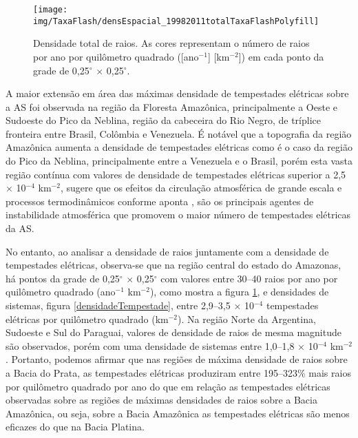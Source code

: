 \begin{figure}[!ht]
 \centering
  {\texttt{[image: img/TaxaFlash/densEspacial\_19982011totalTaxaFlashPolyfill]}}
  \caption{Densidade total de raios. As cores representam o número de raios por ano por quilômetro quadrado ([ano$^{-1}$] [km$^{-2}$]) em cada ponto da grade de 0,25$^{\circ}$ $\times$ 0,25$^{\circ}$. }
  \label{densidadeRaios}
\end{figure}


A maior extensão em área das máximas densidade de tempestades elétricas sobre a AS foi observada na região da Floresta Amazônica, principalmente a Oeste e Sudoeste do Pico da Neblina, região da cabeceira do Rio Negro, de tríplice fronteira entre Brasil, Colômbia e Venezuela. É notável que a topografia da região Amazônica aumenta a densidade de tempestades elétricas como é o caso da região do Pico da Neblina, principalmente entre a Venezuela e o Brasil, porém esta vasta região contínua com valores de densidade de tempestades elétricas superior a  2,5 $\times$ 10$^{-4}$ km$^{-2}$, sugere que os efeitos da circulação atmosférica de grande escala e processos termodinâmicos conforme aponta , são os principais agentes de instabilidade atmosférica que promovem o maior número de tempestades elétricas da AS. 

No entanto, ao analisar a densidade de raios juntamente com a densidade de tempestades elétricas, observa-se que na região central do estado do Amazonas, há pontos da grade de 0,25$^{\circ}$ $\times$ 0,25$^{\circ}$ com valores entre 30--40 raios por ano por quilômetro quadrado (ano$^{-1}$ km$^{-2}$), como mostra a figura \ref{densidadeRaios},  e densidades de sistemas, figura \ref{densidadeTempestade}, entre 2,9--3,5 $\times$ 10$^{-4}$ tempestades elétricas por quilômetro quadrado (km$^{-2}$). Na região Norte da Argentina, Sudoeste e Sul do Paraguai, valores de densidade de raios de mesma magnitude são observados, porém com uma densidade de sistemas entre 1,0--1,8 $\times$ 10$^{-4}$ km$^{-2}$. Portanto, podemos afirmar que nas regiões de máxima densidade de raios sobre a Bacia do Prata, as tempestades elétricas produziram entre 195--323\% mais raios por quilômetro quadrado por ano do que em relação as tempestades elétricas observadas sobre as regiões de máximas densidades de raios sobre a Bacia Amazônica, ou seja, sobre a Bacia Amazônica as tempestades elétricas são menos eficazes do que na Bacia Platina.

